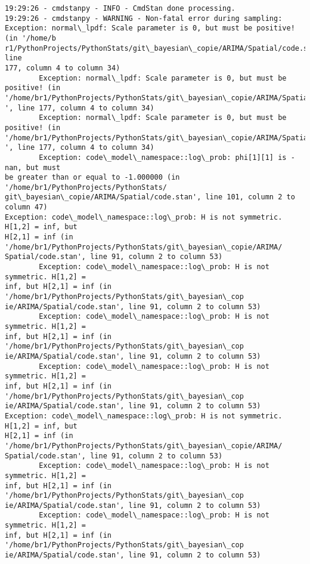 \documentclass[11pt]{article}
\begin{document}
    \begin{Verbatim}[commandchars=\\\{\}]
19:29:26 - cmdstanpy - INFO - CmdStan done processing.
19:29:26 - cmdstanpy - WARNING - Non-fatal error during sampling:
Exception: normal\_lpdf: Scale parameter is 0, but must be positive! (in '/home/b
r1/PythonProjects/PythonStats/git\_bayesian\_copie/ARIMA/Spatial/code.stan', line
177, column 4 to column 34)
        Exception: normal\_lpdf: Scale parameter is 0, but must be positive! (in 
'/home/br1/PythonProjects/PythonStats/git\_bayesian\_copie/ARIMA/Spatial/code.stan
', line 177, column 4 to column 34)
        Exception: normal\_lpdf: Scale parameter is 0, but must be positive! (in 
'/home/br1/PythonProjects/PythonStats/git\_bayesian\_copie/ARIMA/Spatial/code.stan
', line 177, column 4 to column 34)
        Exception: code\_model\_namespace::log\_prob: phi[1][1] is -nan, but must
be greater than or equal to -1.000000 (in '/home/br1/PythonProjects/PythonStats/
git\_bayesian\_copie/ARIMA/Spatial/code.stan', line 101, column 2 to column 47)
Exception: code\_model\_namespace::log\_prob: H is not symmetric. H[1,2] = inf, but
H[2,1] = inf (in '/home/br1/PythonProjects/PythonStats/git\_bayesian\_copie/ARIMA/
Spatial/code.stan', line 91, column 2 to column 53)
        Exception: code\_model\_namespace::log\_prob: H is not symmetric. H[1,2] =
inf, but H[2,1] = inf (in '/home/br1/PythonProjects/PythonStats/git\_bayesian\_cop
ie/ARIMA/Spatial/code.stan', line 91, column 2 to column 53)
        Exception: code\_model\_namespace::log\_prob: H is not symmetric. H[1,2] =
inf, but H[2,1] = inf (in '/home/br1/PythonProjects/PythonStats/git\_bayesian\_cop
ie/ARIMA/Spatial/code.stan', line 91, column 2 to column 53)
        Exception: code\_model\_namespace::log\_prob: H is not symmetric. H[1,2] =
inf, but H[2,1] = inf (in '/home/br1/PythonProjects/PythonStats/git\_bayesian\_cop
ie/ARIMA/Spatial/code.stan', line 91, column 2 to column 53)
Exception: code\_model\_namespace::log\_prob: H is not symmetric. H[1,2] = inf, but
H[2,1] = inf (in '/home/br1/PythonProjects/PythonStats/git\_bayesian\_copie/ARIMA/
Spatial/code.stan', line 91, column 2 to column 53)
        Exception: code\_model\_namespace::log\_prob: H is not symmetric. H[1,2] =
inf, but H[2,1] = inf (in '/home/br1/PythonProjects/PythonStats/git\_bayesian\_cop
ie/ARIMA/Spatial/code.stan', line 91, column 2 to column 53)
        Exception: code\_model\_namespace::log\_prob: H is not symmetric. H[1,2] =
inf, but H[2,1] = inf (in '/home/br1/PythonProjects/PythonStats/git\_bayesian\_cop
ie/ARIMA/Spatial/code.stan', line 91, column 2 to column 53)

\end{Verbatim}
\end{document}
